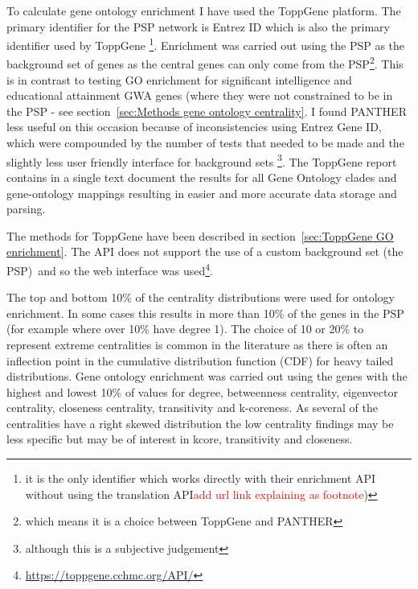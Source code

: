 


To calculate gene ontology enrichment I have used the ToppGene platform\cite{chen2009toppgene}. The primary identifier for the PSP network is Entrez ID which is also the primary identifier used by ToppGene \footnote{it is the only identifier which works directly with their enrichment API without using the translation API\textcolor{red}{add url link explaining as footnote})}. Enrichment was carried out using the PSP as the background set of genes as the central genes can only come from the PSP\footnote{which means it is a choice between ToppGene and PANTHER}. This is in contrast  to testing GO enrichment for significant intelligence and educational attainment GWA genes (where they were not constrained to be in the PSP - see section~\ref{sec:Methods gene ontology centrality}. I found PANTHER less useful on this occasion because of inconsistencies using Entrez Gene ID, which were compounded by the number of tests that needed to be made and the slightly less user friendly interface for background sets \footnote{although this is a subjective judgement}. The ToppGene report contains in a single text document the results for all Gene Ontology clades and gene-ontology mappings resulting in easier and more accurate data storage and parsing. 

The methods for ToppGene have been described in section~\ref{sec:ToppGene GO enrichment}. The API does not support the use of a custom background set (the PSP)\, and so the web interface was used\footnote{\url{https://toppgene.cchmc.org/API/}}. 

The top and bottom 10\% of the centrality distributions were used for ontology enrichment. In some cases this results in more  than 10\% of the genes in the PSP (for example where over 10\% have degree 1). The choice of 10 or 20\% to represent extreme centralities is common in the literature\cite{oldham2019consistency}\cite{hsing2008use} as there is often an inflection point in the cumulative distribution function (CDF) for heavy tailed distributions. Gene ontology enrichment was carried out using the genes with the  highest and lowest 10\% of values for degree, betweenness centrality, eigenvector centrality, closeness centrality, transitivity and k-coreness. As several of the centralities have a right skewed distribution the low centrality findings may be less specific but may be of interest in kcore, transitivity and closeness.

